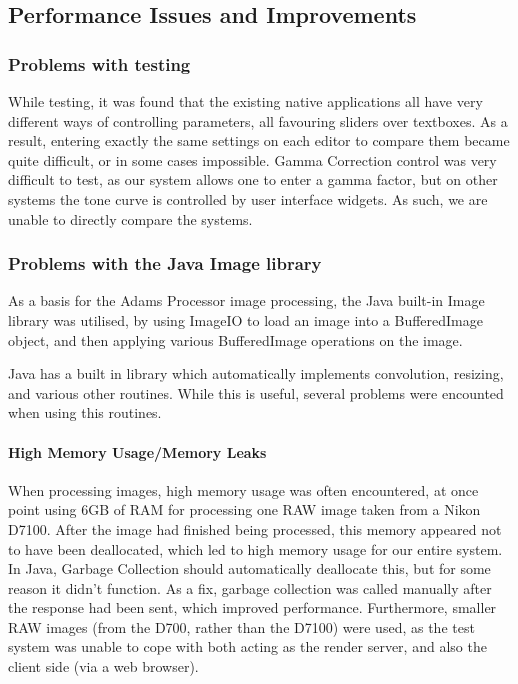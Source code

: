 \documentclass[10pt,a4paper]{article}
\begin{document}
\subsection{Performance Issues and Improvements}

\subsubsection{Problems with testing}
While testing, it was found that the existing native applications all have very different ways of controlling parameters,
all favouring sliders over textboxes. As a result, entering exactly the same settings on each editor to compare them became
quite difficult, or in some cases impossible. Gamma Correction control was very difficult to test, as our system allows one to 
enter a gamma factor, but on other systems the tone curve is controlled by user interface widgets. As such, we are unable to
directly compare the systems.

\subsubsection{Problems with the Java Image library}
As a basis for the Adams Processor image processing, the Java built-in Image library was utilised,
by using ImageIO to load an image into a BufferedImage object, and then applying various BufferedImage operations on
the image.

Java has a built in library which automatically implements convolution, resizing, and various other routines. While
this is useful, several problems were encounted when using this routines. 

\paragraph{High Memory Usage/Memory Leaks}
When processing images, high memory usage was often encountered, at once point using 6GB of RAM for processing 
one RAW image taken from a Nikon D7100. After the image had finished being processed, this memory appeared not to
have been deallocated, which led to high memory usage for our entire system. In Java, Garbage Collection should automatically
deallocate this, but for some reason it didn't function. As a fix, garbage collection was called manually after the response had been sent,
which improved performance. Furthermore, smaller RAW images (from the D700, rather than the D7100) were used, as the test system was unable to cope
with both acting as the render server, and also the client side (via a web browser).
\end{document}
